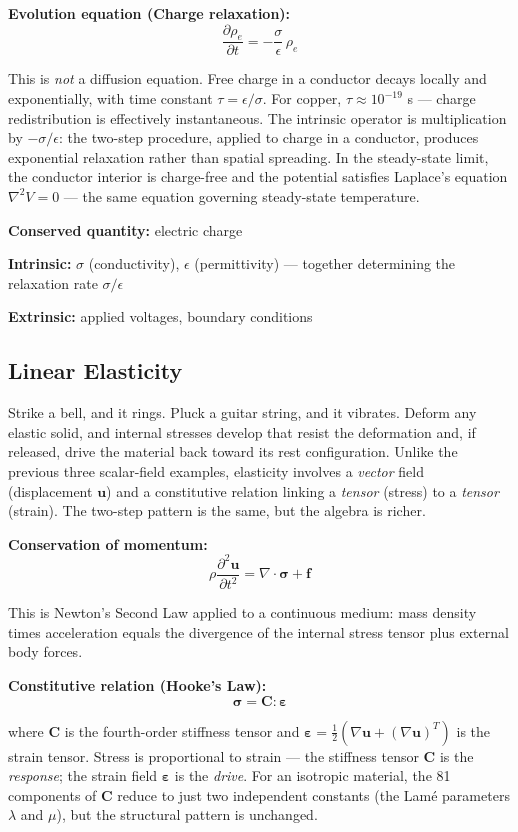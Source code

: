 \documentclass[
  letterpaper,
  DIV=11,
  numbers=noendperiod]{scrartcl}
\begin{document}
\textbf{Evolution equation (Charge relaxation):}
\[\frac{\partial \rho_e}{\partial t} = -\frac{\sigma}{\epsilon}\,\rho_e\]

This is \emph{not} a diffusion equation. Free charge in a conductor
decays locally and exponentially, with time constant
\(\tau = \epsilon/\sigma\). For copper, \(\tau \approx 10^{-19}\) s ---
charge redistribution is effectively instantaneous. The intrinsic
operator is multiplication by \(-\sigma/\epsilon\): the two-step
procedure, applied to charge in a conductor, produces exponential
relaxation rather than spatial spreading. In the steady-state limit, the
conductor interior is charge-free and the potential satisfies Laplace's
equation \(\nabla^2 V = 0\) --- the same equation governing steady-state
temperature.

\textbf{Conserved quantity:} electric charge

\textbf{Intrinsic:} \(\sigma\) (conductivity), \(\epsilon\)
(permittivity) --- together determining the relaxation rate
\(\sigma/\epsilon\)

\textbf{Extrinsic:} applied voltages, boundary conditions

\subsection{Linear Elasticity}\label{linear-elasticity}

Strike a bell, and it rings. Pluck a guitar string, and it vibrates.
Deform any elastic solid, and internal stresses develop that resist the
deformation and, if released, drive the material back toward its rest
configuration. Unlike the previous three scalar-field examples,
elasticity involves a \emph{vector} field (displacement \(\mathbf{u}\))
and a constitutive relation linking a \emph{tensor} (stress) to a
\emph{tensor} (strain). The two-step pattern is the same, but the
algebra is richer.

\textbf{Conservation of momentum:}
\[\rho \frac{\partial^2 \mathbf{u}}{\partial t^2} = \nabla \cdot \boldsymbol{\sigma} + \mathbf{f}\]

This is Newton's Second Law applied to a continuous medium: mass density
times acceleration equals the divergence of the internal stress tensor
plus external body forces.

\textbf{Constitutive relation (Hooke's Law):}
\[\boldsymbol{\sigma} = \mathbf{C} : \boldsymbol{\varepsilon}\]

where \(\mathbf{C}\) is the fourth-order stiffness tensor and
\(\boldsymbol{\varepsilon} = \frac{1}{2}(\nabla\mathbf{u} + (\nabla\mathbf{u})^T)\)
is the strain tensor. Stress is proportional to strain --- the stiffness
tensor \(\mathbf{C}\) is the \emph{response}; the strain field
\(\boldsymbol{\varepsilon}\) is the \emph{drive}. For an isotropic
material, the 81 components of \(\mathbf{C}\) reduce to just two
independent constants (the Lamé parameters \(\lambda\) and \(\mu\)), but
the structural pattern is unchanged.
\end{document}
